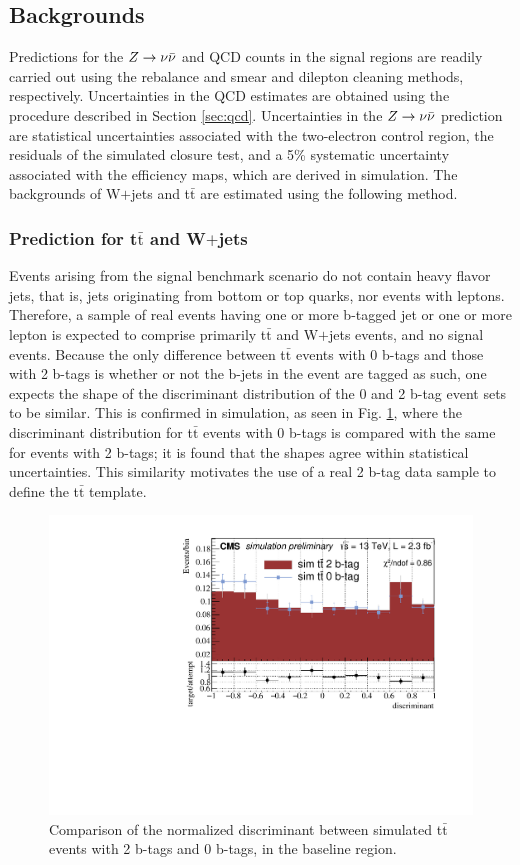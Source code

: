\subsection{Backgrounds}
Predictions for the $Z\rightarrow \nu\bar{\nu}$ and QCD counts in the signal regions are readily carried out using the rebalance and smear and dilepton cleaning methods, respectively. Uncertainties in the QCD estimates are obtained using the procedure described in Section \ref{sec:qcd}. Uncertainties in the $Z\rightarrow \nu\bar{\nu}$ prediction are statistical uncertainties associated with the two-electron control region, the residuals of the simulated closure test, and a 5\% systematic uncertainty associated with the efficiency maps, which are derived in simulation. The backgrounds of W$+$jets and t$\bar{\text{t}}$ are estimated using the following method. 

\subsubsection{Prediction for t$\bar{\text{t}}$ and W$+$jets}
Events arising from the signal benchmark scenario do not contain heavy flavor jets, that is, jets originating from bottom or top quarks, nor events with leptons. Therefore, a sample of real events having one or more b-tagged jet or one or more lepton is expected to comprise primarily t$\bar{\text{t}}$ and W$+$jets events, and no signal events. Because the only difference between t$\bar{\text{t}}$ events with 0 b-tags and those with 2 b-tags is whether or not the b-jets in the event are tagged as such, one expects the shape of the discriminant distribution of the 0 and 2 b-tag event sets to be similar. This is confirmed in simulation, as seen in Fig. \ref{fig:ttbar2b0b}, where the discriminant  distribution for t$\bar{\text{t}}$ events with 0 b-tags is compared with the same for events with 2 b-tags; it is found that the shapes agree within statistical uncertainties. This similarity motivates the use of a real 2 b-tag data sample to define the t$\bar{\text{t}}$ template.
\begin{figure}[tb!]
\centering
\includegraphics[width=0.55\linewidth]{figures/SusySearches/MvaSusy/TTbar2bVs0b.pdf}
\caption{Comparison of the normalized discriminant between simulated t$\bar{\text{t}}$ events with 2 b-tags and 0 b-tags, in the baseline region.}
\label{fig:ttbar2b0b}
\end{figure}

